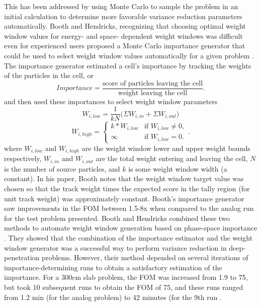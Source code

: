 This has been addressed by using Monte Carlo to sample the problem in an initial
calculation to determine more favorable variance reduction parameters automatically.
Booth and Hendricks,
recognizing that choosing optimal weight window values for energy- and space-
dependent weight windows was difficult even for experienced users proposed a
Monte Carlo importance generator \cite{booth_automatic_1982} that could be used
to select weight window values automatically for a given problem
\cite{hendricks_code-generated_1982}.
The importance generator estimated a cell's importance
by tracking the weights of the particles in the cell, or
\begin{equation}
  Importance  = \frac{\text{score of particles leaving the cell}}
                     {\text{weight leaving the cell}}.
\label{eq:BoothImp}
\end{equation}
and then used these importances to select weight window parameters
\begin{equation}
  W_{i,low} = \frac{1}{kN}\big(\Sigma W_{i,in} + \Sigma W_{i,out} \big)
\end{equation}
\begin{equation}
  W_{i,high} =
  \begin{cases}
    k*W_{i,low} & \text{if } W_{i,low} \neq 0, \\
    \infty & \text{if } W_{i,low} = 0.
  \end{cases}  .
  \label{eq:hendricksWW}
\end{equation}
where $W_{i,low}$ and $W_{i,high}$ are the weight window lower and upper weight
bounds respectively, $W_{i,in}$ and $W_{i,out}$ are the total weight entering
and leaving the cell, $N$ is the number of source particles, and $k$ is some weight
window width (a constant). In his
paper, Booth notes that the weight window target value was chosen so that the
track weight times the expected score in the tally region (for unit track
weight) was approximately constant. Booth's importance generator saw
improvements in the FOM between 1.5-8x when compared to the analog run for the
test problem presented. Booth and Hendricks combined these two methods to
automate weight window generation based on phase-space importance
\cite{booth_deep_1982, booth_importance_1984}. They showed that the combination
of the importance estimator and the weight window generator was a successful way
to perform variance reduction in deep-penetration problems. However, their
method depended on several iterations of importance-determining runs to obtain a
satisfactory estimation of the importance. For a 300cm slab problem, the FOM was
increased from 1.9 to 75, but took 10 subsequent runs to obtain the FOM of 75,
and these runs ranged from 1.2 min (for the analog problem) to 42 minutes (for
the 9th run \cite{booth_importance_1984}.

